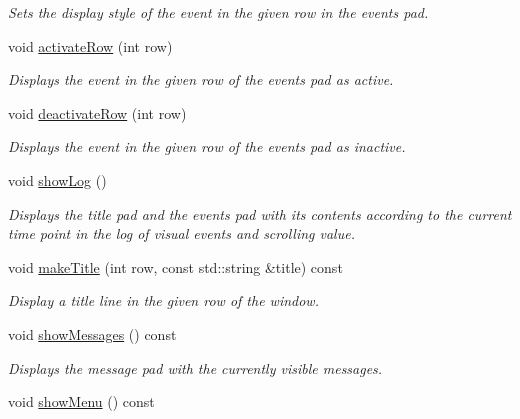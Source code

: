 \begin{DoxyCompactItemize}
\begin{DoxyCompactList}\small\item\em Sets the display style of the event in the given row in the events pad. \end{DoxyCompactList}\item 
void \hyperlink{structslb_1_1core_1_1ui_1_1LogWindow_a475fc90c4a1dc84a50bc512c01203abe}{activate\+Row} (int row)
\begin{DoxyCompactList}\small\item\em Displays the event in the given row of the events pad as active. \end{DoxyCompactList}\item 
void \hyperlink{structslb_1_1core_1_1ui_1_1LogWindow_af1f943d599082ed0a81ea680f4f60897}{deactivate\+Row} (int row)
\begin{DoxyCompactList}\small\item\em Displays the event in the given row of the events pad as inactive. \end{DoxyCompactList}\item 
void \hyperlink{structslb_1_1core_1_1ui_1_1LogWindow_a6292d6785d485c668e8b2d8221a39860}{show\+Log} ()\hypertarget{structslb_1_1core_1_1ui_1_1LogWindow_a6292d6785d485c668e8b2d8221a39860}{}\label{structslb_1_1core_1_1ui_1_1LogWindow_a6292d6785d485c668e8b2d8221a39860}

\begin{DoxyCompactList}\small\item\em Displays the title pad and the events pad with its contents according to the current time point in the log of visual events and scrolling value. \end{DoxyCompactList}\item 
void \hyperlink{structslb_1_1core_1_1ui_1_1LogWindow_ac525dba336c3ea47b45b2fdc6a38dd08}{make\+Title} (int row, const std\+::string \&title) const 
\begin{DoxyCompactList}\small\item\em Display a title line in the given row of the window. \end{DoxyCompactList}\item 
void \hyperlink{structslb_1_1core_1_1ui_1_1LogWindow_ad834e6654bca434e8c6edba96421dc7c}{show\+Messages} () const \hypertarget{structslb_1_1core_1_1ui_1_1LogWindow_ad834e6654bca434e8c6edba96421dc7c}{}\label{structslb_1_1core_1_1ui_1_1LogWindow_ad834e6654bca434e8c6edba96421dc7c}

\begin{DoxyCompactList}\small\item\em Displays the message pad with the currently visible messages. \end{DoxyCompactList}\item 
void \hyperlink{structslb_1_1core_1_1ui_1_1LogWindow_af9e8fecf25411dcecf29ba7cb6dd0b49}{show\+Menu} () const \hypertarget{structslb_1_1core_1_1ui_1_1LogWindow_af9e8fecf25411dcecf29ba7cb6dd0b49}{}\label{structslb_1_1core_1_1ui_1_1LogWindow_af9e8fecf25411dcecf29ba7cb6dd0b49}


\end{DoxyCompactItemize}
